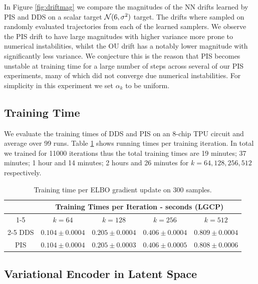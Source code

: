 \documentclass{article} %
\begin{document}
In Figure \ref{fig:driftmag} we compare the magnitudes of the NN drifts learned by PIS and DDS on a scalar target ${\mathcal{N}}(6, \sigma^2)$ target. The drifts where sampled on randomly evaluated trajectories from each of the learned samplers. We observe the PIS drift to have large magnitudes with higher variance more prone to numerical instabilities, whilst the OU drift has a notably lower magnitude with significantly less variance. We conjecture this is the reason that PIS becomes unstable at training time for a large number of steps across several of our PIS experiments, many of which did not converge due numerical instabilities. For simplicity in this experiment we set $\alpha_k$ to be uniform.

\subsection{Training Time} \label{sec:training_time}

We evaluate the training times of DDS and PIS on an 8-chip TPU circuit and average over 99 runs. Table \ref{fig:training_time} shows running times per training iteration. In total we trained for 11000 iterations thus the total training times are  19 minutes; 37 minutes; 1 hour and 14 minutes; 2 hours and 26 minutes for $k=64,128,256,512$ respectively.
\begin{table}[]
\centering
\begin{tabular}{@{}ccccc@{}}
\toprule
    & \multicolumn{4}{c}{Training Times per Iteration - seconds (LGCP)}                                \\ \cmidrule(l){1-5} 
    & $k=64$             & $k=128$            & $k=256$            & $k=512$                           \\ \cmidrule(l){2-5} 
DDS & $0.104 \pm 0.0004$ & $0.205 \pm 0.0004$ & $0.406 \pm 0.0004$ & $0.809 \pm 0.0004$ \\
PIS & $0.104 \pm 0.0004$ & $0.205 \pm 0.0003$ & $0.406 \pm 0.0005$ & $0.808 \pm 0.0006$                \\ \bottomrule
\end{tabular} 
\caption{Training time per ELBO gradient update on 300 samples. \label{fig:training_time}}
\end{table}

\subsection{Variational Encoder in Latent Space} \label{sec:vae_exp}
\end{document}
